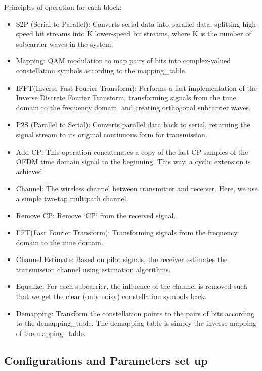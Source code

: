 Principles of operation for each block:
\begin{itemize}
    \item S2P (Serial to Parallel): Converts serial data into parallel data, splitting high-speed bit streams into K lower-speed bit streams, where K is the number of subcarrier waves in the system.
    \item Mapping: QAM modulation to map pairs of bits into complex-valued constellation symbols according to the mapping\_table.
    \item IFFT(Inverse Fast Fourier Transform): Performs a fast implementation of the Inverse Discrete Fourier Transform, transforming signals from the time domain to the frequency domain, and creating orthogonal subcarrier waves.
    \item P2S (Parallel to Serial): Converts parallel data back to serial, returning the signal stream to its original continuous form for transmission.
    \item Add CP:  This operation concatenates a copy of the last CP samples of the OFDM time domain signal to the beginning. This way, a cyclic extension is achieved.
    \item Channel: The wireless channel between transmitter and receiver. Here, we use a simple two-tap multipath channel.
    \item Remove CP: Remove `CP` from the received signal.
    \item FFT(Fast Fourier Transform): Transforming signals from the frequency domain to the time domain.
    \item Channel Estimate: Based on pilot signals, the receiver estimates the transmission channel using estimation algorithms.
    \item Equalize: For each subcarrier, the influence of the channel is removed such that we get the clear (only noisy) constellation symbols back.
    \item Demapping: Transform the constellation points to the pairs of bits according to the demapping\_table. The demapping table is simply the inverse mapping of the mapping\_table.
\end{itemize}

\subsection{Configurations and Parameters set up}


